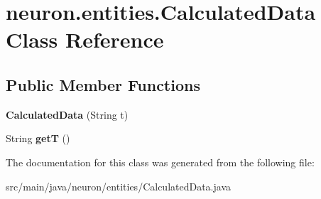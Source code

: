 \hypertarget{classneuron_1_1entities_1_1CalculatedData}{}\section{neuron.\+entities.\+Calculated\+Data Class Reference}
\label{classneuron_1_1entities_1_1CalculatedData}
\subsection*{Public Member Functions}
\begin{DoxyCompactItemize}
\item 
\mbox{\label{classneuron_1_1entities_1_1CalculatedData_a7a67e4dbb5578a08cecd73312dc388c7}} 
{\bfseries Calculated\+Data} (String t)
\item 
\mbox{\label{classneuron_1_1entities_1_1CalculatedData_a8d2483f777fcdb6fe1b207eea78777d0}} 
String {\bfseries getT} ()
\end{DoxyCompactItemize}


The documentation for this class was generated from the following file\+:\begin{DoxyCompactItemize}
\item 
src/main/java/neuron/entities/Calculated\+Data.\+java\end{DoxyCompactItemize}
